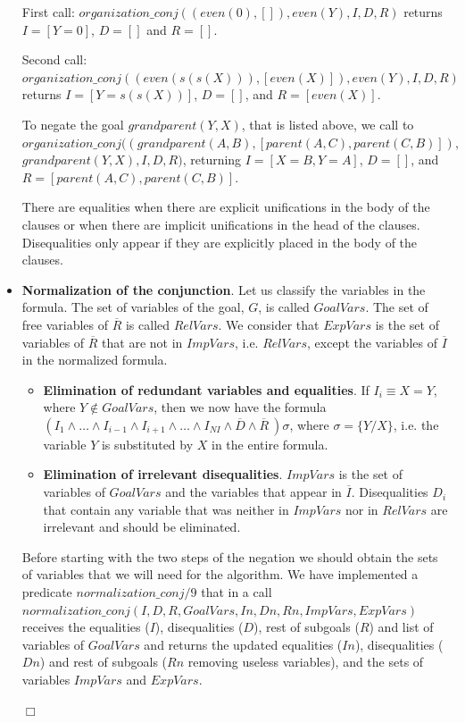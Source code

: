 \documentclass{tlp}
\newcommand{\implementation}[1]{\noindent{\sc Implementation details:}
  #1 $\Box$}
\begin{document}
\begin{itemize}
{First call: $organization\_conj((even(0),[]),even(Y),I,D,R)$ returns $I=[Y=0]$,
$D=[]$ and $R=[]$.

Second call: $organization\_conj((even(s(s(X))),[even(X)]),even(Y),I,D,R)$
returns $I=[Y=s(s(X))]$, $D=[]$, and $R=[even(X)]$.

To negate the goal $grandparent(Y,X)$, that is listed above, we call to \\
$organization\_conj((grandparent(A,B),[parent(A,C),parent(C,B)]),$ \\
$grandparent(Y,X),I,D,R)$,
returning $I=[X=B,Y=A]$, $D=[]$, and $R=[parent(A,C),parent(C,B)]$.

There are equalities when there are explicit unifications in the body of the
clauses or when there are implicit unifications in the head of the
clauses. Disequalities only appear if they are explicitly placed in the body of the
clauses.
}

\item {\bf Normalization of the conjunction}. Let us classify the variables in
the formula. The set of variables of the goal, $G$, is called $GoalVars$. The
set of free variables of $\overline{R}$ is called $RelVars$. We consider that
$ExpVars$ is the set of variables of $\overline{R}$ that are not in $ImpVars$,
i.e. $RelVars$, except the variables of $\overline{I}$ in the normalized
formula.

    \begin{itemize}

       \item {\bf Elimination of redundant variables and equalities}. If $I_i
       \equiv X = Y$, where $Y \not\in GoalVars$, then we now have the formula
       $ ( I_1 \wedge \ldots \wedge I_{i-1} \wedge I_{i+1} \wedge \ldots
       \wedge I_{NI} \wedge \overline{D} \wedge \overline{R}~) \sigma $, where
       $ \sigma = \{ Y / X \}$, i.e. the variable $Y$ is substituted by $X$ in
       the entire formula.
       \item {\bf Elimination of irrelevant disequalities}. $ImpVars$
       is the set of variables of $GoalVars$ and the variables that
       appear in $\overline{I}$. Disequalities $D_i$ that contain
       any variable that was neither in $ImpVars$ nor in $RelVars$ are
       irrelevant and should be eliminated.

    \end{itemize}

\implementation{
Before starting with the two steps of the
negation we should obtain the sets of variables that we will need for the
algorithm. We have implemented a predicate $normalization\_conj/9$ that in a
call  \linebreak
$normalization\_conj(I,D,R,GoalVars,In,Dn,Rn,ImpVars,ExpVars)$ receives
the equalities ($I$), disequalities ($D$), rest of subgoals ($R$) and list of variables of
$GoalVars$ and returns the updated equalities ($In$), disequalities ($Dn$) and rest of
subgoals ($Rn$ removing useless variables), and the sets of variables $ImpVars$ and
$ExpVars$.

}
\end{itemize}
\end{document}
